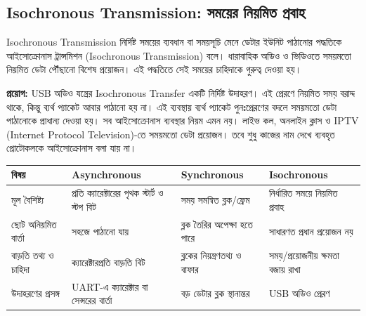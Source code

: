\subsection{Isochronous Transmission: সময়ের নিয়মিত প্রবাহ}
\label{ch2:c02-06}
\begin{definitionbox}{Isochronous Transmission}
নির্দিষ্ট সময়ের ব্যবধান বা সময়সূচি মেনে ডেটার ইউনিট পাঠানোর পদ্ধতিকে আইসোক্রোনাস ট্রান্সমিশন (Isochronous Transmission) বলে। ধারাবাহিক অডিও ও ভিডিওতে সময়মতো নিয়মিত ডেটা পৌঁছানো বিশেষ প্রয়োজন। এই পদ্ধতিতে সেই সময়ের চাহিদাকে গুরুত্ব দেওয়া হয়।
\end{definitionbox}
\textbf{প্রয়োগ:} USB অডিও যন্ত্রের Isochronous Transfer একটি নির্দিষ্ট উদাহরণ। এই প্রেরণে নিয়মিত সময় বরাদ্দ থাকে, কিন্তু ব্যর্থ প্যাকেট আবার পাঠানো হয় না। এই ব্যবস্থায় ব্যর্থ প্যাকেট পুনঃপ্রেরণের বদলে সময়মতো ডেটা পাঠানোকে প্রাধান্য দেওয়া হয়। সব আইসোক্রোনাস ব্যবস্থার নিয়ম এমন নয়। লাইভ কল, অনলাইন ক্লাস ও IPTV (Internet Protocol Television)-তে সময়মতো ডেটা প্রয়োজন। তবে শুধু কাজের নাম দেখে ব্যবহৃত প্রোটোকলকে আইসোক্রোনাস বলা যায় না।
\begin{tabularx}{\linewidth}{|p{.17\linewidth}|X|X|X|}\hline
\textbf{বিষয়} & \textbf{Asynchronous} & \textbf{Synchronous} & \textbf{Isochronous}\\\hline
মূল বৈশিষ্ট্য & প্রতি ক্যারেক্টারের পৃথক স্টার্ট ও স্টপ বিট & সময় সমন্বিত ব্লক/ফ্রেম & নির্ধারিত সময়ে নিয়মিত প্রবাহ\\\hline
ছোট অনিয়মিত বার্তা & সহজে পাঠানো যায় & ব্লক তৈরির অপেক্ষা হতে পারে & সাধারণত প্রধান প্রয়োজন নয়\\\hline
বাড়তি তথ্য ও চাহিদা & ক্যারেক্টারপ্রতি বাড়তি বিট & ব্লকের নিয়ন্ত্রণতথ্য ও বাফার & সময়/প্রয়োজনীয় ক্ষমতা বজায় রাখা\\\hline
উদাহরণের প্রসঙ্গ & UART-এ ক্যারেক্টার বা সেন্সরের বার্তা & বড় ডেটার ব্লক স্থানান্তর & USB অডিও প্রেরণ\\\hline
\end{tabularx}


\endgroup
